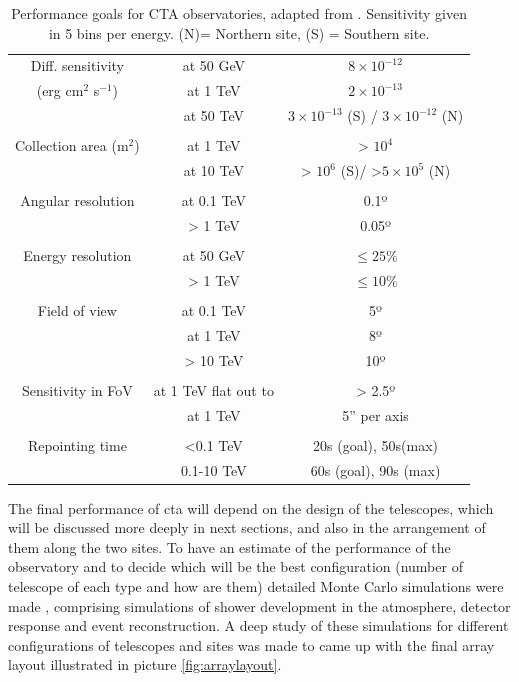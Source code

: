 \documentclass[main.tex]{subfiles}
\begin{document}
\begin{table}
  \centering
  \begin{tabular}{ccc}
    \hline
    Diff. sensitivity & at 50 GeV & $8\times10^{-12}$\\
    (erg cm$^2$ s$^{-1}$) & at 1 TeV & $2\times10^{-13}$\\
     & at 50 TeV & $3\times10^{-13}$ (S) / $3\times10^{-12}$ (N)\\\\
    Collection area (m$^{2}$) & at 1 TeV & > $10^4$ \\
    & at 10 TeV & > $10^6$ (S)/ >$5\times10^5$ (N) \\\\
    Angular resolution & at 0.1 TeV & 0.1º \\
    & > 1 TeV & 0.05º \\\\
    Energy resolution & at 50 GeV & $\le 25\%$ \\
    & > 1 TeV & $\le 10\%$ \\\\
    Field of view & at 0.1 TeV & 5º\\
    & at 1 TeV & 8º\\
    & > 10 TeV & 10º\\\\
    Sensitivity in FoV & at 1 TeV flat out to & > 2.5º \\
    & at 1 TeV & 5'' per axis \\\\
    Repointing time & <0.1 TeV  & 20s (goal), 50s(max) \\
    & 0.1-10 TeV & 60s (goal), 90s (max) \\
    \hline
  \end{tabular}
  \caption{Performance goals for CTA observatories, adapted from \cite{CTAconcept}. Sensitivity given in 5 bins per energy. (N)= Northern site, (S) = Southern site.}
  \label{tab:CTAgoals}
\end{table}

The final performance of \gls{cta} will depend on the design of the telescopes, which will be discussed more deeply in next sections, and also in the arrangement of them along the two sites.
To have an estimate of the performance of the observatory and to decide which will be the best configuration (number of telescope of each type and how are them) detailed Monte Carlo simulations were made \cite{2013CTAMonteCarlo}, comprising simulations of shower development in the atmosphere, detector response and event reconstruction.
A deep study of these simulations \cite{2017CTAMCPerformance} for different configurations of telescopes and sites was made to came up with the final array layout illustrated in picture \ref{fig:arraylayout}.
\end{document}
